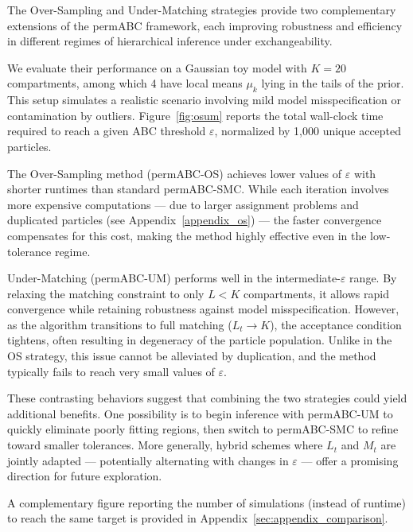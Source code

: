 The Over-Sampling and Under-Matching strategies provide two complementary extensions of the permABC framework, each improving robustness and efficiency in different regimes of hierarchical inference under exchangeability.

We evaluate their performance on a Gaussian toy model with \( K = 20 \) compartments, among which 4 have local means \( \mu_k \) lying in the tails of the prior. This setup simulates a realistic scenario involving mild model misspecification or contamination by outliers. Figure~\ref{fig:osum} reports the total wall-clock time required to reach a given ABC threshold \( \varepsilon \), normalized by 1,000 unique accepted particles.

The Over-Sampling method (permABC-OS) achieves lower values of \( \varepsilon \) with shorter runtimes than standard permABC-SMC. While each iteration involves more expensive computations — due to larger assignment problems and duplicated particles (see Appendix~\ref{appendix_os}) — the faster convergence compensates for this cost, making the method highly effective even in the low-tolerance regime.

Under-Matching (permABC-UM) performs well in the intermediate-\( \varepsilon \) range. By relaxing the matching constraint to only \( L < K \) compartments, it allows rapid convergence while retaining robustness against model misspecification. However, as the algorithm transitions to full matching (\( L_t \to K \)), the acceptance condition tightens, often resulting in degeneracy of the particle population. Unlike in the OS strategy, this issue cannot be alleviated by duplication, and the method typically fails to reach very small values of \( \varepsilon \).

These contrasting behaviors suggest that combining the two strategies could yield additional benefits. One possibility is to begin inference with permABC-UM to quickly eliminate poorly fitting regions, then switch to permABC-SMC to refine toward smaller tolerances. More generally, hybrid schemes where \( L_t \) and \( M_t \) are jointly adapted — potentially alternating with changes in \( \varepsilon \) — offer a promising direction for future exploration.

A complementary figure reporting the number of simulations (instead of runtime) to reach the same target is provided in Appendix~\ref{sec:appendix_comparison}.

